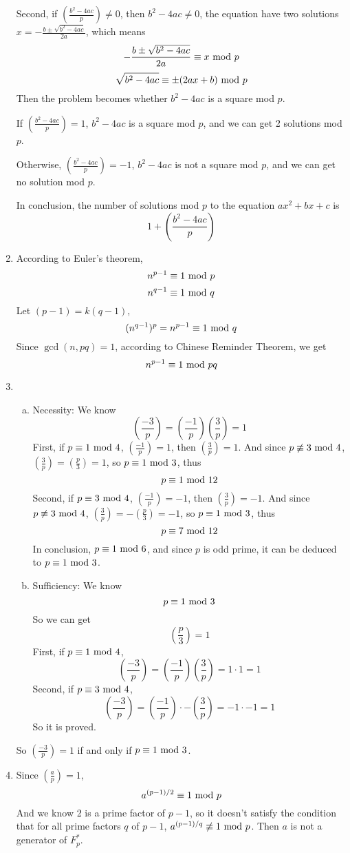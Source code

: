 \documentclass{article}
\renewcommand{\mod}{{\rm\ mod\ }}
\begin{document}
\begin{enumerate}
Second, if $\left(\frac{b^2-4ac}{p}\right)\neq0$, then $b^2-4ac\neq0$, the equation have two solutions $x=-\frac{b\pm\sqrt{b^2-4ac}}{2a}$, which means
$$-\frac{b\pm\sqrt{b^2-4ac}}{2a}\equiv x\mod p$$
$$\sqrt{b^2-4ac}\equiv \pm(2ax+b)\mod p$$
Then the problem becomes whether $b^2-4ac$ is a square mod $p$.

If $\left(\frac{b^2-4ac}{p}\right)=1$, $b^2-4ac$ is a square mod $p$, and we can get 2 solutions mod $p$.

Otherwise, $\left(\frac{b^2-4ac}{p}\right)=-1$, $b^2-4ac$ is not a square mod $p$, and we can get no solution mod $p$.

In conclusion, the number of solutions mod $p$ to the equation $ax^2+bx+c$ is 
$$1+\left(\frac{b^2-4ac}{p}\right)$$
\item
According to Euler's theorem, $$n^{p-1}\equiv1\mod p$$ $$n^{q-1}\equiv1\mod q$$
Let $(p-1)=k(q-1)$,
$$(n^{q-1})^p=n^{p-1}\equiv1\mod q$$
Since $\gcd(n,pq)=1$, according to Chinese Reminder Theorem, we get
$$n^{p-1}\equiv1\mod pq$$

\item
\begin{enumerate}[(a)]
\item Necessity: We know 
$$\left(\frac{-3}{p}\right)=\left(\frac{-1}{p}\right)\left(\frac{3}{p}\right)=1$$
First, if $p\equiv1\mod4$, $\left(\frac{-1}{p}\right)=1$, then $\left(\frac{3}{p}\right)=1$. And since $p\not\equiv3\mod4$, $\left(\frac{3}{p}\right)=\left(\frac{p}{3}\right)=1$, so $p\equiv1\mod3$, thus $$p\equiv1\mod12$$
Second, if $p\equiv3\mod4$, $\left(\frac{-1}{p}\right)=-1$, then $\left(\frac{3}{p}\right)=-1$. And since $p\not\equiv3\mod4$, $\left(\frac{3}{p}\right)=-\left(\frac{p}{3}\right)=-1$, so $p\equiv1\mod3$, thus $$p\equiv7\mod12$$
In conclusion, $p\equiv1\mod6$, and since $p$ is odd prime, it can be deduced to $p\equiv1\mod3$.
\item Sufficiency: We know
$$p\equiv1\mod3$$
So we can get $$\left(\frac{p}{3}\right)=1$$
First, if $p\equiv1\mod4$, $$\left(\frac{-3}{p}\right)=\left(\frac{-1}{p}\right)\left(\frac{3}{p}\right)=1\cdot1=1$$
Second, if $p\equiv3\mod4$, $$\left(\frac{-3}{p}\right)=\left(\frac{-1}{p}\right)\cdot-\left(\frac{3}{p}\right)=-1\cdot-1=1$$
So it is proved.
\end{enumerate}
So $\left(\frac{-3}{p}\right)=1$ if and only if $p\equiv1\mod3$.

\item
Since $\left(\frac{a}{p}\right)=1$,
$$a^{(p-1)/2}\equiv1\mod p$$
And we know 2 is a prime factor of $p-1$, so it doesn't satisfy the condition that for all prime factors $q$ of $p-1$, $a^{(p-1)/q}\not\equiv1\mod p$. Then $a$ is not a generator of $F_p^*$.

\end{enumerate}
\end{document}
